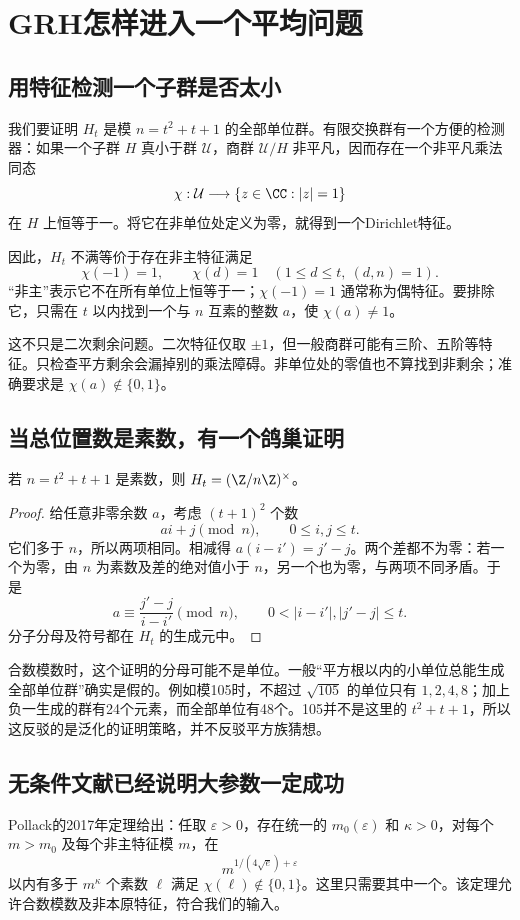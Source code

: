 \chapter{GRH怎样进入一个平均问题}\label{ch:characters}
\section{用特征检测一个子群是否太小}
我们要证明 $H_t$ 是模 $n=t^2+t+1$ 的全部单位群。有限交换群有一个方便的检测器：如果一个子群 $H$ 真小于群 $\mathcal U$，商群 $\mathcal U/H$ 非平凡，因而存在一个非平凡乘法同态
\[\chi:\mathcal U\longrightarrow\{z\in\CC:|z|=1\}
\]
在 $H$ 上恒等于一。将它在非单位处定义为零，就得到一个Dirichlet特征。

因此，$H_t$ 不满等价于存在非主特征满足
\[\chi(-1)=1,\qquad\chi(d)=1\quad(1\le d\le t,\ (d,n)=1).
\]
“非主”表示它不在所有单位上恒等于一；$\chi(-1)=1$ 通常称为偶特征。要排除它，只需在 $t$ 以内找到一个与 $n$ 互素的整数 $a$，使 $\chi(a)\ne1$。

这不只是二次剩余问题。二次特征仅取 $\pm1$，但一般商群可能有三阶、五阶等特征。只检查平方剩余会漏掉别的乘法障碍。非单位处的零值也不算找到非剩余；准确要求是 $\chi(a)\notin\{0,1\}$。

\section{当总位置数是素数，有一个鸽巢证明}
\begin{proposition}
若 $n=t^2+t+1$ 是素数，则 $H_t=(\Z/n\Z)^\times$。
\end{proposition}
\begin{proof}
给任意非零余数 $a$，考虑 $(t+1)^2$ 个数
\[ai+j\pmod n,\qquad0\le i,j\le t.
\]
它们多于 $n$，所以两项相同。相减得 $a(i-i')=j'-j$。两个差都不为零：若一个为零，由 $n$ 为素数及差的绝对值小于 $n$，另一个也为零，与两项不同矛盾。于是
\[a\equiv\frac{j'-j}{i-i'}\pmod n,
\qquad0<|i-i'|,|j'-j|\le t.
\]
分子分母及符号都在 $H_t$ 的生成元中。
\end{proof}

合数模数时，这个证明的分母可能不是单位。一般“平方根以内的小单位总能生成全部单位群”确实是假的。例如模105时，不超过 $\sqrt{105}$ 的单位只有 $1,2,4,8$；加上负一生成的群有24个元素，而全部单位有48个。105并不是这里的 $t^2+t+1$，所以这反驳的是泛化的证明策略，并不反驳平方族猜想。

\section{无条件文献已经说明大参数一定成功}
Pollack的2017年定理给出：任取 $\varepsilon>0$，存在统一的 $m_0(\varepsilon)$ 和 $\kappa>0$，对每个 $m>m_0$ 及每个非主特征模 $m$，在
\[m^{1/(4\sqrt e)+\varepsilon}
\]
以内有多于 $m^\kappa$ 个素数 $\ell$ 满足 $\chi(\ell)\notin\{0,1\}$。这里只需要其中一个。该定理允许合数模数及非本原特征，符合我们的输入。\cite{Pollack2017}


